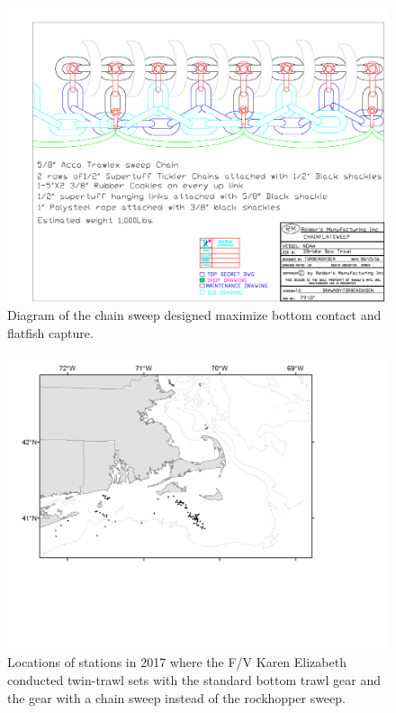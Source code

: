 \documentclass[12pt,letterpaper, leqno]{article}
\begin{document}
\begin{figure}
\caption{Diagram of the chain sweep designed maximize bottom contact and flatfish capture.}\label{chainsweep_schematic}
\begin{center}
\includegraphics[width = \textwidth]{chainsweep_schematic.pdf}
\end{center}
\end{figure}
\clearpage


\begin{figure}
\caption{Locations of stations in 2017 where the F/V Karen Elizabeth conducted twin-trawl sets with the standard bottom trawl gear and the gear with a chain sweep instead of the rockhopper sweep.}\label{2017_tow_locations}
\begin{center}
\includegraphics[width = \textwidth]{2017_tow_locations.png}
\end{center}
\end{figure}
\end{document}
